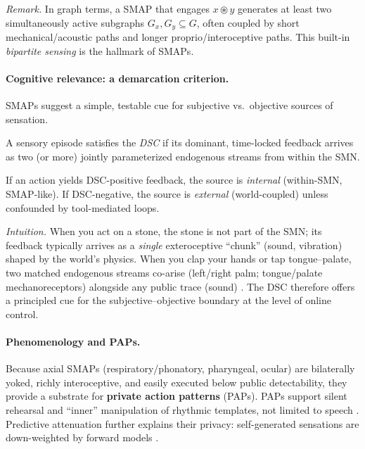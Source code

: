 \noindent \emph{Remark.} In graph terms, a SMAP that engages $x \circledast y$ generates at least two simultaneously active subgraphs $G_x,G_y\subseteq G$, often coupled by short mechanical/acoustic paths and longer proprio/interoceptive paths. This built-in \emph{bipartite sensing} is the hallmark of SMAPs.

\paragraph{Cognitive relevance: a demarcation criterion.}
SMAPs suggest a simple, testable cue for subjective vs.\ objective sources of sensation.

\begin{definition}
A sensory episode satisfies the \emph{DSC} if its dominant, time-locked feedback arrives as two (or more) jointly parameterized endogenous streams from within the SMN. 
\end{definition}

\begin{lemma}
If an action yields DSC-positive feedback, the source is \emph{internal} (within-SMN, SMAP-like). If DSC-negative, the source is \emph{external} (world-coupled) unless confounded by tool-mediated loops. 
\end{lemma}

\noindent \emph{Intuition.} When you act on a stone, the stone is not part of the SMN; its feedback typically arrives as a \emph{single} exteroceptive “chunk” (sound, vibration) shaped by the world’s physics. When you clap your hands or tap tongue–palate, two matched endogenous streams co-arise (left/right palm; tongue/palate mechanoreceptors) alongside any public trace (sound) \citep{BlakemoreWolpertFrith1998Tickle}. The DSC therefore offers a principled cue for the subjective–objective boundary at the level of online control.

\paragraph{Phenomenology and PAPs.}
Because axial SMAPs (respiratory/phonatory, pharyngeal, ocular) are bilaterally yoked, richly interoceptive, and easily executed below public detectability, they provide a substrate for \textbf{private action patterns} (PAPs). PAPs support silent rehearsal and “inner” manipulation of rhythmic templates, not limited to speech \citep{AldersonDayFernyhough2015InnerSpeech,Guenther2016NeuralControlSpeech,Seth2013InteroceptiveInference}. Predictive attenuation further explains their privacy: self-generated sensations are down-weighted by forward models \citep{MiallWolpert1996ForwardModels,BlakemoreWolpertFrith1998Tickle}.

